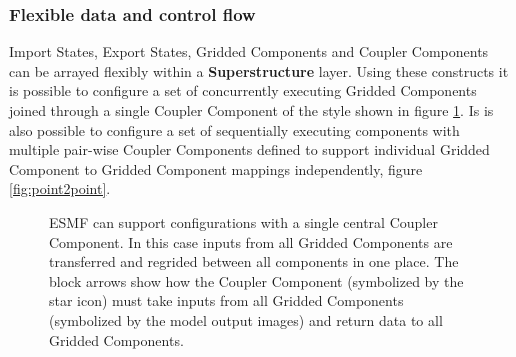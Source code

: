 \subsubsection{Flexible data and control flow}
Import States, Export States, Gridded Components and Coupler Components can be arrayed flexibly
within a {\bf Superstructure} layer. Using these constructs it is possible to configure a set of concurrently
executing Gridded Components joined through a single Coupler Component of the style shown in figure 
\ref{fig:hubspoke}. Is is also possible to configure a set of sequentially executing components with multiple
pair-wise Coupler Components defined to support individual Gridded Component to Gridded 
Component mappings independently, figure \ref{fig:point2point}.

\begin{figure}
\caption{ESMF can support configurations with a single central Coupler Component. In this case inputs from all Gridded 
Components are transferred and regrided between all components in one place. The block arrows show how the 
Coupler Component 
(symbolized by the star icon) must take inputs from all Gridded Components (symbolized by the model output images) 
and return data to all Gridded Components.}
\label{fig:hubspoke}
\end{figure}

